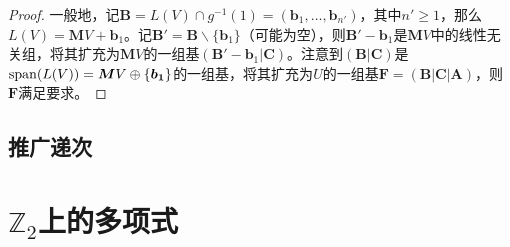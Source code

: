 \begin{proof}
  一般地，记$\boldsymbol{B}=L(V)\cap g^{-1}(1)=(\boldsymbol{b}_1,\dots,\boldsymbol{b}_{n'})$，其中$n'\ge 1$，那么$L(V)=\boldsymbol{M}V+\boldsymbol{b}_1$。记$\boldsymbol{B}'=\boldsymbol{B}\backslash\{\boldsymbol{b}_1\}$（可能为空），则$\boldsymbol{B}'-\boldsymbol{b}_1$是$\boldsymbol{M}V$中的线性无关组，将其扩充为$\boldsymbol{M}V$的一组基$(\boldsymbol{B}'-\boldsymbol{b}_1|\boldsymbol{C})$。注意到$(\boldsymbol{B}|\boldsymbol{C})$是$\operatorname{span}(L(V))=\boldsymbol{M}V\oplus\{\boldsymbol{b_1}\}$的一组基，将其扩充为$U$的一组基$\boldsymbol{F}=(\boldsymbol{B}|\boldsymbol{C}|\boldsymbol{A})$，则$\boldsymbol{F}$满足要求。

\end{proof}

\subsection{推广递次}

\section{\texorpdfstring{$\mathbb{Z}_2$}{Z\_2}上的多项式}
